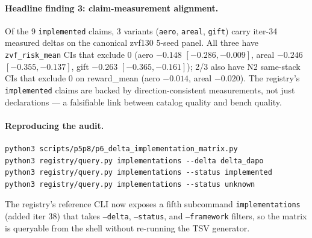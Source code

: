 \paragraph{Headline finding 3: claim-measurement alignment.}
Of the 9 \texttt{implemented} claims, 3 variants
(\texttt{aero}, \texttt{areal}, \texttt{gift}) carry iter-34 measured
deltas on the canonical zvf130 5-seed panel. All three have
\texttt{zvf\_risk\_mean} CIs that exclude 0 (aero $-0.148$
$[-0.286, -0.009]$, areal $-0.246$ $[-0.355, -0.137]$, gift $-0.263$
$[-0.365, -0.161]$); 2/3 also have N2 same-stack CIs that exclude 0
on reward\_mean (aero $-0.014$, areal $-0.020$). The registry's
\texttt{implemented} claims are backed by direction-consistent
measurements, not just declarations --- a falsifiable link between
catalog quality and bench quality.

\paragraph{Reproducing the audit.}
\begin{verbatim}
python3 scripts/p5p8/p6_delta_implementation_matrix.py
python3 registry/query.py implementations --delta delta_dapo
python3 registry/query.py implementations --status implemented
python3 registry/query.py implementations --status unknown
\end{verbatim}
The registry's reference CLI now exposes a fifth subcommand
\texttt{implementations} (added iter 38) that takes
\texttt{--delta}, \texttt{--status}, and \texttt{--framework} filters,
so the matrix is queryable from the shell without re-running the TSV
generator.

